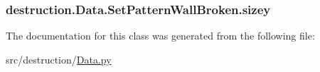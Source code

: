 \hypertarget{classdestruction_1_1_data_1_1_set_pattern_wall_broken_aa0f58abac32ab94b1d6eb0aca620eb23}{
\subsubsection[{sizey}]{\setlength{\rightskip}{0pt plus 5cm}destruction.\-Data.\-Set\-Pattern\-Wall\-Broken.\-sizey}}\label{classdestruction_1_1_data_1_1_set_pattern_wall_broken_aa0f58abac32ab94b1d6eb0aca620eb23}


The documentation for this class was generated from the following file\-:\begin{DoxyCompactItemize}
\item 
src/destruction/\hyperlink{_data_8py}{Data.\-py}\end{DoxyCompactItemize}
